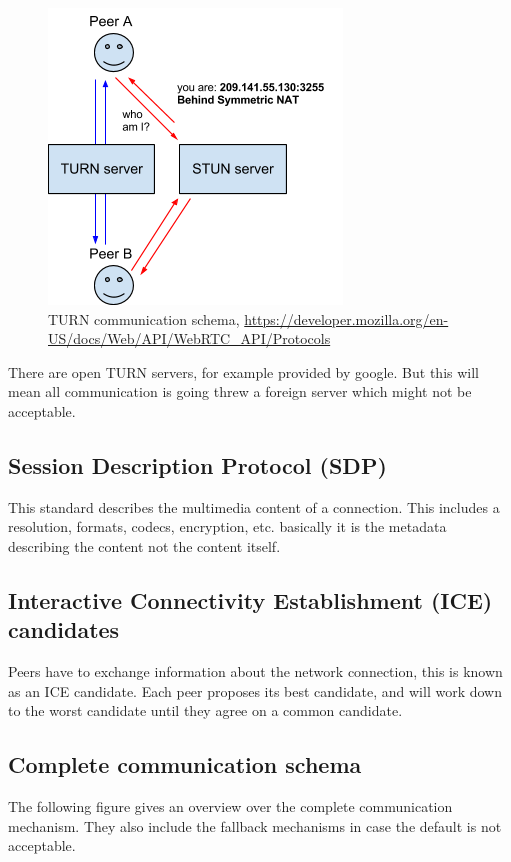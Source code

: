 \begin{figure}[H]
	\includegraphics[scale=0.5]{images/webrtc-turn.png}
	\centering
	\caption{TURN communication schema, \url{https://developer.mozilla.org/en-US/docs/Web/API/WebRTC_API/Protocols}}
	\label{fig:TURN}
\end{figure}

There are open TURN servers, for example provided by google. But this will mean all communication is going threw a foreign server which might not be acceptable.

\subsection{Session Description Protocol (SDP)}
This standard describes the multimedia content of a connection. This includes a resolution, formats, codecs, encryption, etc. basically it is the metadata describing the content not the content itself.

\subsection{Interactive Connectivity Establishment (ICE) candidates}
Peers have to exchange information about the network connection, this is known as an ICE candidate. Each peer proposes its best candidate, and will work down to the worst candidate until they agree on a common candidate.

\subsection{Complete communication schema}
The following figure gives an overview over the complete communication mechanism. They also include the fallback mechanisms in case the default is not acceptable.

